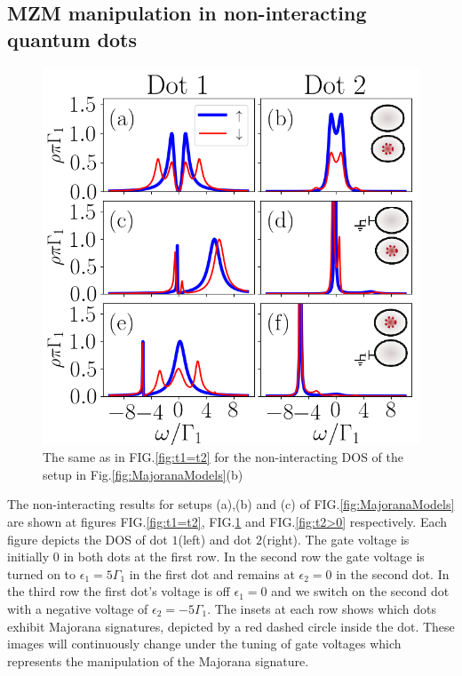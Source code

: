 \documentclass[showpacs,aps,prb,reprint,superscriptaddress]{revtex4-1}
\begin{document}
     \subsection{MZM manipulation in non-interacting quantum dots \label{subsect:non-int}}

     

\begin{figure}[bt]
\begin{center}
\includegraphics[scale=0.48]{Graficos/t1>0.png}
\caption{  \label{fig:t1>0} The same as in FIG.\ref{fig:t1=t2} for the non-interacting DOS of the setup in Fig.\ref{fig:MajoranaModels}(b) 
}
%
\end{center}
\end{figure}


 	 The non-interacting results for setups (a),(b) and (c) of FIG.\ref{fig:MajoranaModels} are shown at figures FIG.\ref{fig:t1=t2}, FIG.\ref{fig:t1>0} and FIG.\ref{fig:t2>0} respectively. Each figure depicts the DOS of dot $1$(left) and dot $2$(right). The gate voltage is initially $0$ in both dots at the first row. In the second row the gate voltage is turned on to  $\epsilon_1 = 5\Gamma_1$ in the first dot and remains at $\epsilon_2 = 0$ in the second dot. In the third row the first dot's voltage is off $\epsilon_1=0$ and we switch on the second dot with a negative voltage of $\epsilon_2 = -5\Gamma_1$. The insets at each row shows which dots exhibit Majorana signatures, depicted by a red dashed circle inside the dot. These images will continuously change under the tuning of gate voltages which represents the manipulation of the Majorana signature.
\end{document}
